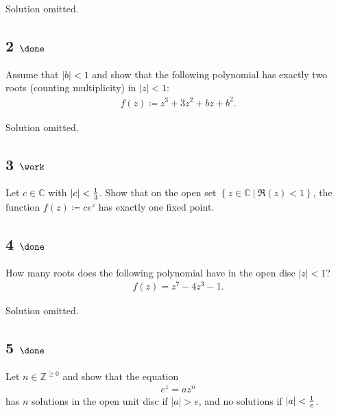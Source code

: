 Solution omitted.

\hypertarget{done-10}{%
\subsection{\texorpdfstring{2
\(\done\)}{2 \textbackslash done}}\label{done-10}}

Assume that \({\left\lvert {b} \right\rvert} < 1\) and show that the
following polynomial has exactly two roots (counting multiplicity) in
\({\left\lvert {z} \right\rvert} < 1\):
\begin{align*}
f(z) \coloneqq z^3 + 3z^2 + bz + b^2
.\end{align*}

Solution omitted.

\hypertarget{work-64}{%
\subsection{\texorpdfstring{3
\(\work\)}{3 \textbackslash work}}\label{work-64}}

Let \(c\in {\mathbb{C}}\) with
\({\left\lvert {c} \right\rvert} < {1\over 3}\). Show that on the open
set \(\left\{{z\in {\mathbb{C}}{~\mathrel{\Big|}~}\Re(z) < 1}\right\}\),
the function \(f(z) \coloneqq ce^z\) has exactly one fixed point.

\hypertarget{done-11}{%
\subsection{\texorpdfstring{4
\(\done\)}{4 \textbackslash done}}\label{done-11}}

How many roots does the following polynomial have in the open disc
\({\left\lvert {z} \right\rvert} < 1\)?
\begin{align*}
f(z) = z^7 - 4z^3 - 1
.\end{align*}

Solution omitted.

\hypertarget{done-12}{%
\subsection{\texorpdfstring{5
\(\done\)}{5 \textbackslash done}}\label{done-12}}

Let \(n\in {\mathbb{Z}}^{\geq 0}\) and show that the equation
\begin{align*}
e^z = az^n
\end{align*}
has \(n\) solutions in the open unit disc if
\({\left\lvert {a} \right\rvert} > e\), and no solutions if
\({\left\lvert {a} \right\rvert} < {1\over e}\).

